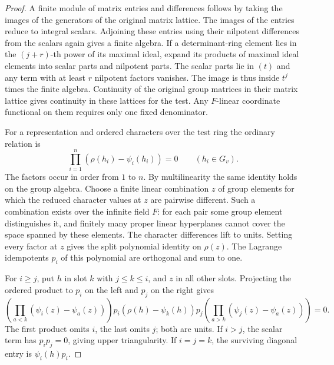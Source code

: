 \begin{proof}
A finite module of matrix
entries and differences follows by taking the images
of the generators of the original matrix lattice.
The images of the entries reduce to integral scalars.
Adjoining these entries using their nilpotent
differences from the scalars again gives a finite
algebra. If a determinant-ring element lies in the
\((j+r)\)-th power of its maximal ideal, expand its
products of maximal ideal elements into scalar parts
and nilpotent parts. The scalar parts lie in \((t)\)
and any term with at least \(r\) nilpotent factors
vanishes. The image is thus inside \(t^j\) times
the finite algebra. Continuity of the original
group matrices in their matrix lattice gives
continuity in these lattices for the test. Any
\(F\)-linear coordinate functional on them requires
only one fixed denominator.
\label{cor:ordinary-patching-cotangent-6}

For a representation and ordered characters over the
test ring the ordinary relation is
\[
              \prod_{i=1}^n(\rho(h_i)-\psi_i(h_i))=0
                  \qquad(h_i\in G_v).
\]
The factors occur in order from \(1\) to \(n\).
By multilinearity the same identity holds on the group
algebra. Choose a finite linear combination \(z\) of group
elements for which the reduced character values at \(z\)
are pairwise different. Such a combination exists over
the infinite field \(F\): for each pair some group
element distinguishes it, and finitely many proper
linear hyperplanes cannot cover the space spanned by
these elements. The character differences lift to
units. Setting every factor at \(z\) gives the split
polynomial identity on \(\rho(z)\). The Lagrange
idempotents \(p_i\) of this polynomial are orthogonal
and sum to one.

For \(i\ge j\), put \(h\) in slot \(k\) with
\(j\le k\le i\), and \(z\) in all other slots.
Projecting the ordered product to \(p_i\) on the left
and \(p_j\) on the right gives
\[
 \left(\prod_{a<k}(\psi_i(z)-\psi_a(z))\right)
     p_i(\rho(h)-\psi_k(h))p_j
 \left(\prod_{a>k}(\psi_j(z)-\psi_a(z))\right)=0.
\]
The first product omits \(i\), the last omits \(j\);
both are units. If \(i>j\), the scalar term has
\(p_i p_j=0\), giving upper triangularity. If \(i=j=k\),
the surviving diagonal entry is \(\psi_i(h)p_i\).


\end{proof}
